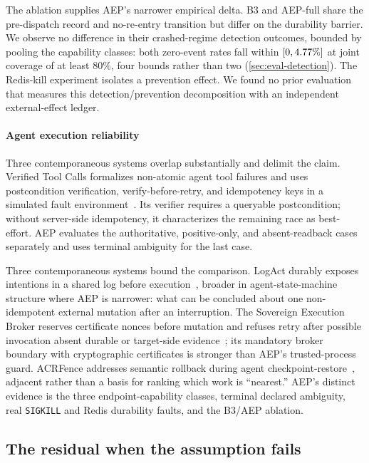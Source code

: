 The ablation supplies AEP's narrower empirical delta. B3 and AEP-full share the
pre-dispatch record and no-re-entry transition but differ on the durability
barrier. We observe no difference in their crashed-regime detection outcomes,
bounded by pooling the capability classes: both zero-event rates fall within
$[0,4.77{}\%]$ at joint coverage of at least 80\%, four
bounds rather than two (\cref{sec:eval-detection}). The Redis-kill experiment isolates a prevention
effect. We found no prior evaluation that measures this detection/prevention
decomposition with an independent external-effect ledger.

\paragraph{Agent execution reliability} Three contemporaneous systems overlap
substantially and delimit the claim. Verified Tool Calls formalizes non-atomic
agent tool failures and uses postcondition verification, verify-before-retry,
and idempotency keys in a simulated fault environment~\cite{mansoor2026verified}.
Its verifier requires a queryable postcondition; without server-side
idempotency, it characterizes the remaining race as best-effort. AEP evaluates
the authoritative, positive-only, and absent-readback cases separately and
uses terminal ambiguity for the last case.

Three contemporaneous systems bound the comparison. LogAct durably exposes
intentions in a shared log before execution~\cite{balakrishnan2026logact},
broader in agent-state-machine structure where AEP is narrower: what can be
concluded about one non-idempotent external mutation after an interruption. The
Sovereign Execution Broker reserves certificate nonces before mutation and
refuses retry after possible invocation absent durable or target-side
evidence~\cite{he2026seb}; its mandatory broker boundary with cryptographic
certificates is stronger than AEP's trusted-process guard. ACRFence addresses
semantic rollback during agent checkpoint-restore~\cite{zheng2026acrfence},
adjacent rather than a basis for ranking which work is ``nearest.'' AEP's
distinct evidence is the three endpoint-capability classes, terminal declared
ambiguity, real \texttt{SIGKILL} and Redis durability faults, and the B3/AEP
ablation.

\subsection{The residual when the assumption fails}

